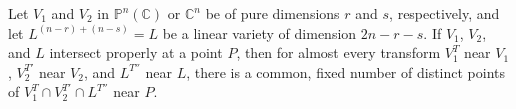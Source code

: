Let $V_1$ and $V_2$ in $\mathbb{P}^n(\mathbb{C})$ or $\mathbb{C}^n$ be of pure dimensions $r$ and $s$, respectively, and let $L^{(n-r)+(n-s)} = L$ be a linear variety of dimension $2n - r - s$. If $V_1$, $V_2$, and $L$ intersect properly at a point $P$, then for almost every transform $V_1^T$ near $V_1$, $V_2^{T'}$ near $V_2$, and $L^{T''}$ near $L$, there is a common, fixed number of distinct points of $V_1^T \cap V_2^{T'} \cap L^{T''}$ near $P$.
